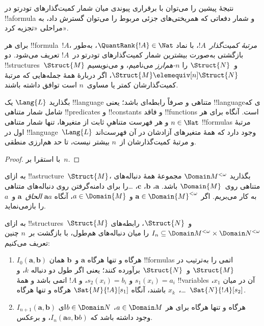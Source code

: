 \documentclass[../../../include/open-logic-section]{subfiles}
\begin{document}
نتیجهٔ پیشین را می‌توان با برقراری پیوندی میان شمار کمیت‌گذارهای
تودرتو در !!a{formula} و شمار دفعاتی که همریختی‌های جزئی مربوط را
می‌توان گسترش داد، به مراحلی «تجزیه کرد».

\begin{defn}
  برای هر !!{formula}~$!A$، \emph{مرتبهٔ کمیت‌گذار}~$!A$، با نماد
  $\QuantRank{!A} \in \Nat$، به‌طور بازگشتی به‌صورت بیشترین شمار
  کمیت‌گذارهای تودرتو در~$!A$ تعریف می‌شود. دو
  !!{structure}s~$\Struct{M}$ و~$\Struct{N}$ را \emph{$n$-هم‌ارز}
  می‌نامیم، و می‌نویسیم $\Struct{M} \elemequiv[n] \Struct{N}$، اگر
  دربارهٔ همهٔ جمله‌هایی که مرتبهٔ کمیت‌گذارشان کمتر یا مساوی~$n$ است
  توافق داشته باشند.
\end{defn}

\begin{prop}
  بگذارید $\Lang{L}$ یک !!{language} متناهی و صرفاً رابطه‌ای باشد؛
  یعنی !!{language}ی که شامل شمار متناهی !!{predicate}s و
  !!{constant}s و فاقد !!{function}s است. آنگاه برای هر $n \in \Nat$
  و هر فهرست متناهیِ ثابت از متغیرها، تنها شمار متناهی !!{formula}s
  مرتبهٔ اول در !!{language}~$\Lang{L}$ وجود دارد که همهٔ متغیرهای
  آزادشان در آن فهرست‌اند و مرتبهٔ کمیت‌گذارشان از~$n$ بیشتر نیست، تا
  حد هم‌ارزی منطقی.
\end{prop}

\begin{proof}
  با استقرا بر~$n$.
\end{proof}

\begin{defn}
  به ازای !!a{structure}~$\Struct{M}$، بگذارید
  $\Domain M^{<\omega}$ مجموعهٔ همهٔ دنباله‌های متناهی روی~$\Domain{M}$
  باشد. $\mathbf{a}$، $\mathbf{b}$، $\mathbf{c}$، \ldots را برای
  دامنه‌گرفتن روی دنباله‌های متناهی به کار می‌بریم. اگر
  $\mathbf{a} \in \Domain{M}^{<\omega}$ و $a \in \Domain{M}$، آنگاه
  $\mathbf{a}a$ \emph{الحاق}~$\mathbf{a}$ و~$a$ را بازمی‌نماید.
\end{defn}

\begin{defn}
  به ازای !!{structure}s~$\Struct{M}$ و~$\Struct{N}$، رابطه‌های
  $I_n \subseteq \Domain M^{<\omega} \times \Domain N^{<\omega}$ را
  میان دنباله‌های هم‌طول، با بازگشت بر~$n$ چنین تعریف می‌کنیم:
   \begin{enumerate}
   \item $I_0(\mathbf{a},\mathbf{b})$ هرگاه و تنها هرگاه
     $\mathbf{a}$ و~$\mathbf{b}$ همان !!{formula}s اتمی را به‌ترتیب در
     $\Struct{M}$ و~$\Struct{N}$ برآورده کنند؛ یعنی اگر طول دو دنباله
     $k$، و $s_1(x_i) = a_i$ و $s_2(x_i) = b_i$، و $!A$ اتمی باشد و
     همهٔ !!{variable}s آن در میان $x_1$، \dots،~$x_k$ باشند، آنگاه
     $\Sat{M}{!A}[s_1]$ هرگاه و تنها هرگاه~$\Sat{N}{!A}[s_2]$.
   \item $I_{n+1} (\mathbf{a},\mathbf{b})$ هرگاه و تنها هرگاه برای هر
     $a\in \Domain M$، $b\in \Domain N$ای وجود داشته باشد که
     $I_n (\mathbf{a}a,\mathbf{b}b)$، و برعکس.
   \end{enumerate}
\end{defn}
\end{document}
